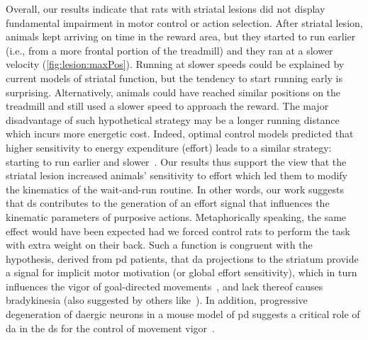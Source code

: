 \par
Overall, our results indicate that rats with striatal lesions did not display fundamental impairment in motor control or action selection.
After striatal lesion, animals kept arriving on time in the reward area, but they started to run earlier (i.e., from a more frontal portion of the treadmill) and they ran at a slower velocity (\autoref{fig:lesion:maxPos}).\footnotemark
{}
Running at slower speeds could be explained by current models of striatal function, but the tendency to start running early is surprising.
Alternatively, animals could have reached similar positions on the treadmill and still used a slower speed to approach the reward.
The major disadvantage of such hypothetical strategy may be a longer running distance which incurs more energetic cost.
Indeed, optimal control models predicted that higher sensitivity to energy expenditure (effort) leads to a similar strategy: starting to run earlier and slower~\cite{JuradoParras2020}.
Our results thus support the view that the striatal lesion increased animals' sensitivity to effort which led them to modify the kinematics of the wait-and-run routine.
In other words, our work suggests that \gls{ds} contributes to the generation of an effort signal that influences the kinematic parameters of purposive actions.
Metaphorically speaking, the same effect would have been expected had we forced control rats to perform the task with extra weight on their back.
Such a function is congruent with the hypothesis, derived from \gls{pd} patients, that \gls{da} projections to the striatum provide a signal for implicit motor motivation (or global effort sensitivity), which in turn influences the vigor of goal-directed movements~\cite{Mazzoni2007}, and lack thereof causes bradykinesia (also suggested by others like~\cite{Berke2018NN, Beeler2012Fron}).
In addition, progressive degeneration of \gls{da}ergic neurons in a mouse model of \gls{pd} suggests a critical role of \gls{da} in the \gls{ds} for the control of movement vigor~\cite{Panigrahi2015Cell}.
